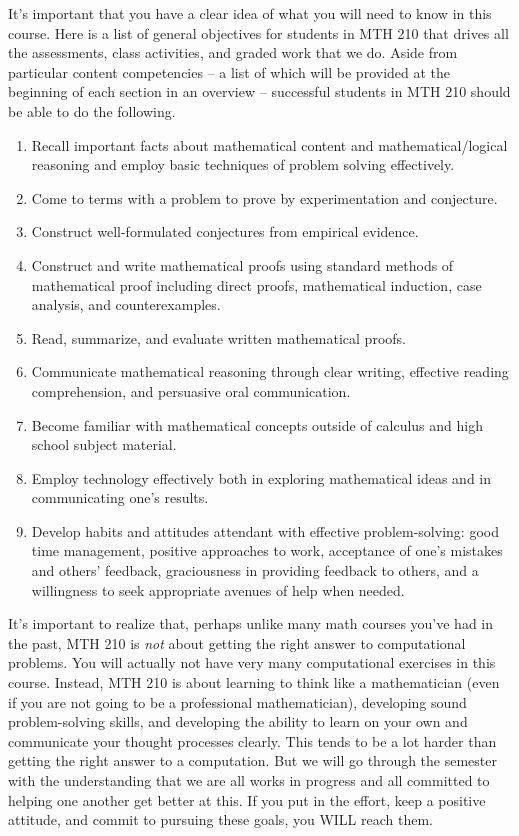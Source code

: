\documentclass[11pt]{article}
\begin{document}
It's important that you have a clear idea of what you will need to know in this course. Here is a list of general objectives for students in MTH 210 that drives all the assessments, class activities, and graded work that we do. Aside from particular content competencies -- a list of which will be provided at the beginning of each section in an overview -- successful students in MTH 210 should be able to do the following. 
\begin{enumerate}
	\item Recall important facts about mathematical content and mathematical/logical reasoning and employ basic techniques of problem solving effectively. 
	\item Come to terms with a problem to prove by experimentation and conjecture.
	\item Construct well-formulated conjectures from empirical evidence. 
	\item Construct and write mathematical proofs using standard methods of mathematical proof including direct proofs, mathematical induction, case analysis, and counterexamples. 
	\item Read, summarize, and evaluate written mathematical proofs. 
	\item Communicate mathematical reasoning through clear writing, effective reading comprehension, and persuasive oral communication. 
	\item Become familiar with mathematical concepts outside of calculus and high school subject material. 
	\item Employ technology effectively both in exploring mathematical ideas and in communicating one's results. 
	\item Develop habits and attitudes attendant with effective problem-solving: good time management, positive approaches to work, acceptance of one's mistakes and others' feedback, graciousness in providing feedback to others, and a willingness to seek appropriate avenues of help when needed.
\end{enumerate}
It's important to realize that, perhaps unlike many math courses you've had in the past, MTH 210 is \emph{not} about getting the right answer to computational problems. You will actually not have very many computational exercises in this course. Instead, MTH 210 is about learning to think like a mathematician (even if you are not going to be a professional mathematician), developing sound problem-solving skills, and developing the ability to learn on your own and communicate your thought processes clearly. This tends to be a lot harder than getting the right answer to a computation. But we will go through the semester with the understanding that we are all works in progress and all committed to helping one another get better at this. If you put in the effort, keep a positive attitude, and commit to pursuing these goals, you WILL reach them. 
\end{document}
